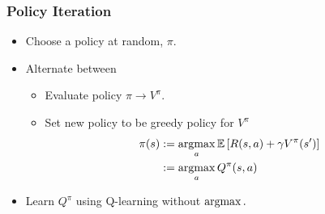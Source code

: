

\begin{frame}
	\frametitle{Policy Iteration}
	
	\begin{itemize}
		\item<1-> Choose a policy at random, $\pi
		$.
		\item<2-> Alternate between
		\begin{itemize}
			\item<2-> Evaluate policy $\pi \to V^\pi$.
			\item<3-> Set new policy to be greedy policy for $V^\pi$
			\begin{equation*}
			\begin{aligned}
				\pi(s) & := \mathop{\mathrm{argmax}}_a \mathbb{E}\left[R(s,a) + \gamma V^{\pi}(s')\right] \\
						& := \mathop{\mathrm{argmax}}_a Q^{\pi}(s, a)
			\end{aligned}
			\end{equation*}
		\end{itemize}
			\item<4-> Learn $Q^{\pi}$ using Q-learning without $\mathop{\mathrm{argmax}}.$
	\end{itemize}

\end{frame}


